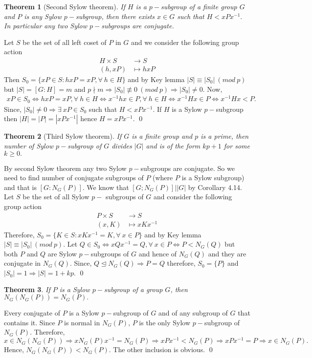 \documentclass[11pt]{amsart}
\newtheorem{theorem}{Theorem}[section]
\begin{document}
\begin{theorem}[Second Sylow theorem]
If $H$ is a $p-$subgroup of a finite group $G$ and $P$ is any Sylow $p-$subgroup, then there exists $x\in G$ such that $H<xPx^{-1}.$ In particular any two Sylow $p-$subgroups are conjugate.
\end{theorem}
\proof Let $S$ be the set of all left coset of $P$ in $G$ and we consider the following group action \begin{align*}
H\times S&\to S\\
(h,xP)&\mapsto hxP
\end{align*}
Then $S_0=\{xP\in S:hxP=xP,\forall~h\in H\}$ and by Key lemma $|S|\equiv |S_0|~(mod~p)$ but $|S|=[G:H]=m$ and $p\nmid m \Rightarrow |S_0|\not\equiv 0~(mod~p) \Rightarrow |S_0|\neq 0.$
Now, \begin{align*}
xP\in S_0 \Leftrightarrow hxP=xP,\forall~h\in H
\Leftrightarrow x^{-1}hx\in P,\forall~h\in H
\Leftrightarrow x^{-1}Hx\in P
\Leftrightarrow x^{-1}Hx< P.
\end{align*}
Since, $|S_0|\neq 0 \Rightarrow \exists~xP\in S_0$ such that $H<xPx^{-1}$. If $H$ is a Sylow $p-$subgroup then $|H|=|P|=|xPx^{-1}|$ hence $H=xPx^{-1}.$ \qed
\begin{theorem}[Third Sylow theorem]
If $G$ is a finite group and $p$ is a prime, then number of Sylow $p-$subgroup of $G$ divides $|G|$ and is of the form $kp+1$ for some $k\geq 0.$
\end{theorem}
\proof By second Sylow theorem any two Sylow $p-$subgroups are conjugate. So we need to find number of conjugate subgroups of $P$ (where $P$ is a Sylow subgroup) and that is $[G:N_G(P)]$. We know that $[G;N_G(P)]\big| |G|$ by Corollary 4.14. Let $S$ be the set of all Sylow $p-$ subgroups of $G$ and consider the following group action \begin{align*}
P\times S&\to S\\
(x,K)&\mapsto xKx^{-1}
\end{align*}
Therefore, $S_0=\{K\in S:xKx^{-1}=K,\forall~x\in P\}$ and by Key lemma $|S|\equiv |S_0|~(mod~p).$ Let $Q\in S_0 \Leftrightarrow xQx^{-1}=Q,\forall~x\in P \Leftrightarrow P<N_G(Q)$ but both $P$ and $Q$ are Sylow $p-$subgroups of $G$ and hence of $N_G(Q)$ and they are conjugate in $N_G(Q).$ Since, $Q\mathrel{\unlhd} N_G(Q) \Rightarrow P=Q$ therefore, $S_0=\{P\}$ and $|S_0|=1 \Rightarrow |S|=1+kp.$ \qed


\begin{theorem}
If $P$ is a Sylow $p-$subgroup of a group $G$, then $N_G(N_G(P))=N_G(P).$
\end{theorem}
\proof Every conjugate of $P$ is a Sylow $p-$subgroup of $G$ and of any subgroup of $G$ that contains it. Since $P$ is normal in $N_G(P)$, $P$ is the only Sylow $p-$subgroup of $N_G(P).$ Therefore, $x\in N_G(N_G(P)) \Rightarrow xN_G(P)x^{-1}=N_G(P) \Rightarrow xPx^{-1}<N_G(P) \Rightarrow xPx^{-1}=P \Rightarrow x\in N_G(P).$ Hence, $N_G(N_G(P))<N_G(P).$ The other inclusion is obvious. \qed
\end{document}
